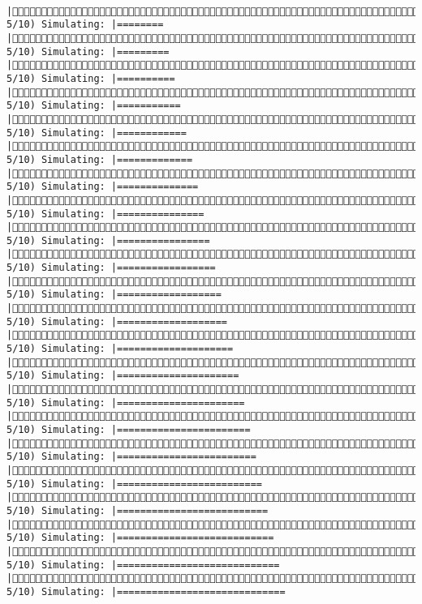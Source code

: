 \documentclass[]{article}
\begin{document}
\begin{verbatim}
             |( 5/10) Simulating: |========                                             |( 5/10) Simulating: |=========                                            |( 5/10) Simulating: |==========                                           |( 5/10) Simulating: |===========                                          |( 5/10) Simulating: |============                                         |( 5/10) Simulating: |=============                                        |( 5/10) Simulating: |==============                                       |( 5/10) Simulating: |===============                                      |( 5/10) Simulating: |================                                     |( 5/10) Simulating: |=================                                    |( 5/10) Simulating: |==================                                   |( 5/10) Simulating: |===================                                  |( 5/10) Simulating: |====================                                 |( 5/10) Simulating: |=====================                                |( 5/10) Simulating: |======================                               |( 5/10) Simulating: |=======================                              |( 5/10) Simulating: |========================                             |( 5/10) Simulating: |=========================                            |( 5/10) Simulating: |==========================                           |( 5/10) Simulating: |===========================                          |( 5/10) Simulating: |============================                         |( 5/10) Simulating: |=============================                        
\end{verbatim}
\end{document}
